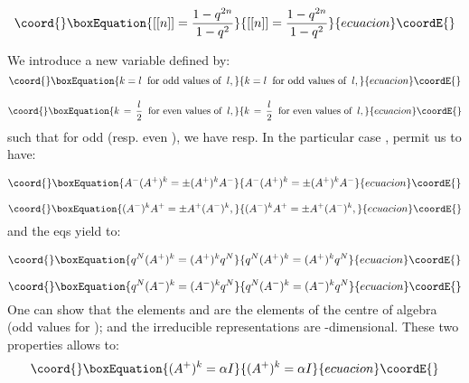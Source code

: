 \documentclass[a4paper,12pt,thmsa]{article}
\begin{document}
\begin{equation}\coord{}\boxEquation{
\lbrack [n]]=\frac{1-q^{2n}}{1-q^2}
}{
\lbrack [n]]=\frac{1-q^{2n}}{1-q^2}
}{ecuacion}\coordE{}\end{equation}

We introduce a new variable \coordHE{} defined by:
\begin{equation}\coord{}\boxEquation{
k=l\;\; \hbox{for  odd  values  of}\;\; l,
}{
k=l\;\; \hbox{for  odd  values  of}\;\; l,
}{ecuacion}\coordE{}\end{equation}

\begin{equation}\coord{}\boxEquation{
k\, =\, \frac l2\;\; \hbox{for even values of}\;\; l,
}{
k\, =\, \frac l2\;\; \hbox{for even values of}\;\; l,
}{ecuacion}\coordE{}\end{equation}
such that for odd \coordHE{} (resp. even \coordHE{} ), we have \coordHE{}  \myHighlight{$($}\coordHE{}resp. \coordHE{}
In the particular case \coordHE{}, \coordHE{}  \coordHE{} permit us to have:

\begin{equation}\coord{}\boxEquation{
A^{-}(A^{+})^k=\pm (A^{+})^kA^{-}
}{
A^{-}(A^{+})^k=\pm (A^{+})^kA^{-}
}{ecuacion}\coordE{}\end{equation}

\begin{equation}\coord{}\boxEquation{
(A^{-})^kA^{+}=\pm A^{+}(A^{-})^k,
}{
(A^{-})^kA^{+}=\pm A^{+}(A^{-})^k,
}{ecuacion}\coordE{}\end{equation}
and the eqs \coordHE{} yield to:

\begin{equation}\coord{}\boxEquation{
q^N(A^{+})^k=(A^{+})^kq^N
}{
q^N(A^{+})^k=(A^{+})^kq^N
}{ecuacion}\coordE{}\end{equation}

\begin{equation}\coord{}\boxEquation{
q^N(A^{-})^k=(A^{-})^kq^N
}{
q^N(A^{-})^k=(A^{-})^kq^N
}{ecuacion}\coordE{}\end{equation}
One can show that the elements \coordHE{} and \coordHE{} are the elements
of the centre of \coordHE{} algebra (odd values for \coordHE{}); and the irreducible
representations are \coordHE{}-dimensional. These two properties allows to:
\begin{equation}\coord{}\boxEquation{
(A^{+})^k=\alpha I
}{
(A^{+})^k=\alpha I
}{ecuacion}\coordE{}\end{equation}
\end{document}
